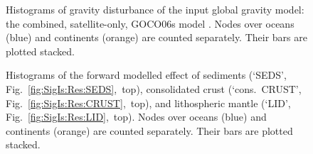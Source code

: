 \begin{figure}
    \begin{adjustbox}{center}
    \end{adjustbox}
    \caption[Histogram of the disturbance from the input global gravity model.]{
        Histograms of gravity disturbance of the input global gravity model: the combined, satellite-only, GOCO06s model \parencite{Kvas_GOCO06s_dataset}.
        Nodes over oceans (blue) and continents (orange) are counted separately. Their bars are plotted stacked.
    }
    \label{fig:SigIs:Res:HistGGMin}
\end{figure}

\FloatBarrier

\begin{figure}
    \begin{adjustbox}{center}
    \end{adjustbox}
    \caption[Histograms of the SEDS, CRUST, LID corrections.]{
        Histograms of the forward modelled effect of sediments (`{SEDS}', Fig.~\ref{fig:SigIs:Res:SEDS},~top), consolidated crust (`{cons.~CRUST}', Fig.~\ref{fig:SigIs:Res:CRUST},~top), and lithospheric mantle (`{LID}', Fig.~\ref{fig:SigIs:Res:LID},~top).
        Nodes over oceans (blue) and continents (orange) are counted separately. Their bars are plotted stacked.
    }
    \label{fig:SigIs:Res:HistFwdCrust}
\end{figure}

